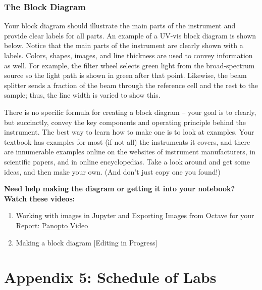 \documentclass[]{tufte-book}
\providecommand{\tightlist}{%
  \setlength{\itemsep}{0pt}\setlength{\parskip}{0pt}}
\begin{document}
\hypertarget{the-block-diagram}{%
\subsection*{The Block Diagram}\label{the-block-diagram}}

Your block diagram should illustrate the main parts of the instrument and provide clear labels for all parts. An example of a UV-vis block diagram is shown below. Notice that the main parts of the instrument are clearly shown with a labels. Colors, shapes, images, and line thickness are used to convey information as well. For example, the filter wheel selects green light from the broad-spectrum source so the light path is shown in green after that point. Likewise, the beam splitter sends a fraction of the beam through the reference cell and the rest to the sample; thus, the line width is varied to show this.

There is no specific formula for creating a block diagram -- your goal is to clearly, but succinctly, convey the key components and operating principle behind the instrument. The best way to learn how to make one is to look at examples. Your textbook has examples for most (if not all) the instruments it covers, and there are innumerable examples online on the websites of instrument manufacturers, in scientific papers, and in online encyclopedias. Take a look around and get some ideas, and then make your own. (And don't just copy one you found!)

\textbf{Need help making the diagram or getting it into your notebook? Watch these videos:}

\begin{enumerate}
\def\labelenumi{\arabic{enumi}.}
\tightlist
\item
  Working with images in Jupyter and Exporting Images from Octave for your Report: \href{https://wcu.hosted.panopto.com/Panopto/Pages/Viewer.aspx?id=57aa8a5b-df1d-4004-927a-ab90001bc595}{Panopto Video}
\item
  Making a block diagram {[}Editing in Progress{]}
\end{enumerate}

\hypertarget{appendix-5-schedule-of-labs}{%
\chapter*{Appendix 5: Schedule of Labs}\label{appendix-5-schedule-of-labs}}
\end{document}
